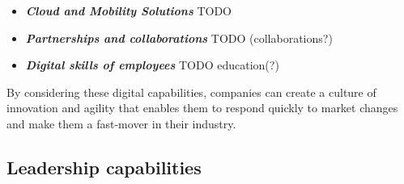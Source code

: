 \documentclass[a4]{scrartcl}
\begin{document}
\begin{itemize}
		
		\item \textit{\textbf{Cloud and Mobility Solutions}} TODO
		
		
		\item \textit{\textbf{Partnerships and collaborations}} TODO (collaborations?)
		
		
		\item \textit{\textbf{Digital skills of employees}} TODO education(?)
		
		
		
	\end{itemize}
	

	By considering these digital capabilities, companies can create a culture of innovation and agility that enables them to respond quickly to market changes and make them a fast-mover in their industry.
	
	
	
	
	
	
	
	
	\subsection{Leadership capabilities} \label{subsec:leadershipcapabilities}
	
	
	
	
\end{document}
